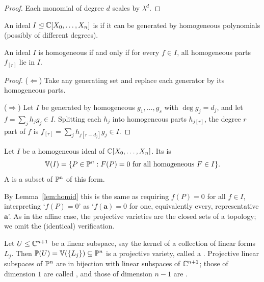 \documentclass[a4paper]{scrartcl}
\newcommand{\V}{\mathbb{V}}
\begin{document}
\begin{proof}
	Each monomial of degree $d$ scales by $\lambda^d$.
\end{proof}

\begin{definition}
	An ideal $I \trianglelefteq \mathbb{C}[X_0,\dots,X_n]$ is  if it can be generated by homogeneous polynomials (possibly of different degrees).
\end{definition}

\begin{lemma}\label{lem:homid}
	An ideal $I$ is homogeneous if and only if for every $f \in I$, all homogeneous parts $f_{[r]}$ lie in $I$.
\end{lemma}

\begin{proof}
	($\Leftarrow$) Take any generating set and replace each generator by its homogeneous parts.

	($\Rightarrow$) Let $I$ be generated by homogeneous $g_1,\dots,g_s$ with $\deg g_j = d_j$, and let $f = \sum_j h_j g_j \in I$. Splitting each $h_j$ into homogeneous parts $h_{j[r]}$, the degree $r$ part of $f$ is $f_{[r]} = \sum_j h_{j[r-d_j]}g_j \in I$.
\end{proof}

\begin{definition}
	Let $I$ be a homogeneous ideal of $\mathbb{C}[X_0,\dots,X_n]$. Its  is
	$$\V(I) = \{P \in \PP^n : F(P) = 0 \text{ for all homogeneous } F \in I\}.$$
	A  is a subset of $\mathbb{P}^n$ of this form.
\end{definition}

By Lemma~\ref{lem:homid} this is the same as requiring $f(P) = 0$ for all $f \in I$, interpreting `$f(P) = 0$' as `$f(\mathbf a) = 0$ for one, equivalently every, representative $\mathbf a$'. As in the affine case, the projective varieties are the closed sets of a topology; we omit the (identical) verification.

\begin{example}
	Let $U \leq \mathbb{C}^{n+1}$ be a linear subspace, say the kernel of a collection of linear forms $L_j$. Then $\PP(U) = \V(\{L_j\}) \subseteq \PP^n$ is a projective variety, called a . Projective linear subspaces of $\mathbb{P}^n$ are in bijection with linear subspaces of $\mathbb{C}^{n+1}$; those of dimension $1$ are called , and those of dimension $n-1$ are .
\end{example}
\end{document}
